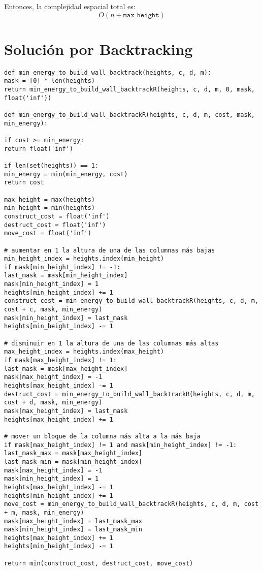 \documentclass[a4paper,12pt]{article}
\begin{document}
Entonces, la complejidad espacial total es:
\[
O(n + \texttt{max\_height})
\]


\section{Solución por Backtracking}


\begin{verbatim}
def min_energy_to_build_wall_backtrack(heights, c, d, m):
mask = [0] * len(heights)
return min_energy_to_build_wall_backtrackR(heights, c, d, m, 0, mask, float('inf'))

def min_energy_to_build_wall_backtrackR(heights, c, d, m, cost, mask, min_energy):

if cost >= min_energy:
return float('inf') 

if len(set(heights)) == 1:
min_energy = min(min_energy, cost)
return cost

max_height = max(heights)
min_height = min(heights)
construct_cost = float('inf')
destruct_cost = float('inf')
move_cost = float('inf')

# aumentar en 1 la altura de una de las columnas más bajas 
min_height_index = heights.index(min_height)
if mask[min_height_index] != -1:
last_mask = mask[min_height_index]
mask[min_height_index] = 1
heights[min_height_index] += 1
construct_cost = min_energy_to_build_wall_backtrackR(heights, c, d, m, cost + c, mask, min_energy)
mask[min_height_index] = last_mask
heights[min_height_index] -= 1

# disminuir en 1 la altura de una de las columnas más altas
max_height_index = heights.index(max_height)
if mask[max_height_index] != 1:
last_mask = mask[max_height_index]
mask[max_height_index] = -1
heights[max_height_index] -= 1
destruct_cost = min_energy_to_build_wall_backtrackR(heights, c, d, m, cost + d, mask, min_energy)
mask[max_height_index] = last_mask
heights[max_height_index] += 1

# mover un bloque de la columna más alta a la más baja
if mask[max_height_index] != 1 and mask[min_height_index] != -1:
last_mask_max = mask[max_height_index]
last_mask_min = mask[min_height_index]
mask[max_height_index] = -1
mask[min_height_index] = 1
heights[max_height_index] -= 1
heights[min_height_index] += 1
move_cost = min_energy_to_build_wall_backtrackR(heights, c, d, m, cost + m, mask, min_energy)
mask[max_height_index] = last_mask_max
mask[min_height_index] = last_mask_min
heights[max_height_index] += 1
heights[min_height_index] -= 1

return min(construct_cost, destruct_cost, move_cost)

\end{verbatim}
\end{document}
